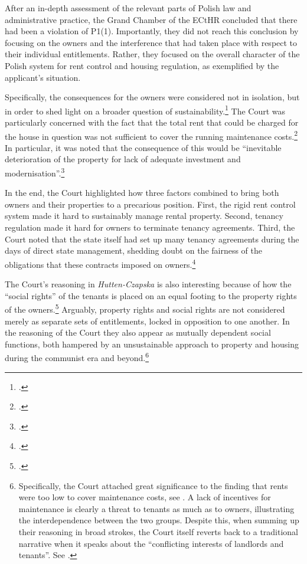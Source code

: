 After an in-depth assessment of the relevant parts of Polish law and administrative practice, the Grand Chamber of the ECtHR concluded that there had been a violation of P1(1). Importantly, they did not reach this conclusion by focusing on the owners and the interference that had taken place with respect to their individual entitlements. Rather, they focused on the overall character of the Polish system for rent control and housing regulation, as exemplified by the applicant's situation.

Specifically, the consequences for the owners were considered not in isolation, but in order to shed light on a broader question of sustainability.\footcite[60-61]{hutten06} The Court was particularly concerned with the fact that the total rent that could be charged for the house in question was not sufficient to cover the running maintenance costs.\footcite[224]{hutten06} In particular, it was noted that the consequence of this would be ``inevitable deterioration of the property for lack of adequate investment and modernisation''.\footnote{\cite[224]{hutten06}.}

In the end, the Court highlighted how three factors combined to bring both owners and their properties  to a precarious position. First, the rigid rent control system made it hard to sustainably manage rental property. Second, tenancy regulation made it hard for owners to terminate tenancy agreements. Third, the Court noted that the state itself had set up many tenancy agreements during the days of direct state management, shedding doubt on the fairness of the obligations that these contracts imposed on owners.\footcite[224-225]{hutten06} 

The Court's reasoning in {\it Hutten-Czapska} is also interesting because of how the ``social rights'' of the tenants is placed on an equal footing to the property rights of the owners.\footcite[225]{hutten06} Arguably, property rights and social rights are not considered merely as separate sets of entitlements, locked in opposition to one another. In the reasoning of the Court they also appear as mutually dependent social functions, both hampered by an unsustainable approach to property and housing during the communist era and beyond.\footnote{Specifically, the Court attached great significance to the finding that rents were too low to cover maintenance costs, see \cite[224]{hutten06}. A lack of incentives for maintenance is clearly a threat to tenants as much as to owners, illustrating the interdependence between the two groups. Despite this, when summing up their reasoning in broad strokes, the Court itself reverts back to a traditional narrative when it speaks about the ``conflicting interests of landlords and tenants''. See \cite[225]{hutten06}.}

